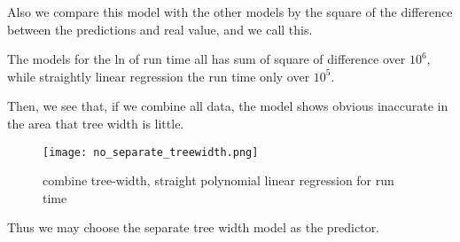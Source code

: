 Also we compare this model with the other models by the square of the difference between the predictions and real value, and we call this.

The models for the ln of run time all has sum of square of difference over $10^{6}$, while straightly linear regression the run time only over $10^{5}$.

Then, we see that, if we combine all data, the model shows obvious inaccurate in the area that tree width is little.

\begin{figure}[h!]
    \centering
    \texttt{[image: no\_separate\_treewidth.png]}
    \caption{combine tree-width, straight polynomial linear regression for run time}
    \label{combine tree-width, straight polynomial linear regression for run time}
    \end{figure}

Thus we may choose the separate tree width model as the predictor.